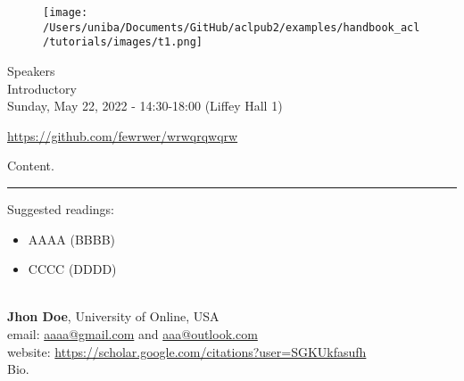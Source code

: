 \begin{center}
    \vspace{-0.5cm}
        \begin{figure}[h!]
      \texttt{[image: /Users/uniba/Documents/GitHub/aclpub2/examples/handbook\_acl/tutorials/images/t1.png]}
    \end{figure}
    \normalsize{Speakers}\\
    \large{Introductory}\\
    \large{Sunday, May 22, 2022 - 14:30-18:00 (Liffey Hall 1)}\\
    \par\bigskip
    \normalsize{\url{https://github.com/fewrwer/wrwqrqwqrw}}

\end{center}

Content.

\begin{center}
    \noindent\rule{200px}{1pt}
\end{center}

Suggested readings:
\begin{itemize}
    \item AAAA (BBBB)
    \item CCCC (DDDD)
\end{itemize}



\noindent
\\
\textbf{Jhon Doe}, University of Online, USA\\
\noindent
email: \url{aaaa@gmail.com} and \url{aaa@outlook.com}\\
website: \url{https://scholar.google.com/citations?user=SGKUkfasufh}\\
Bio.